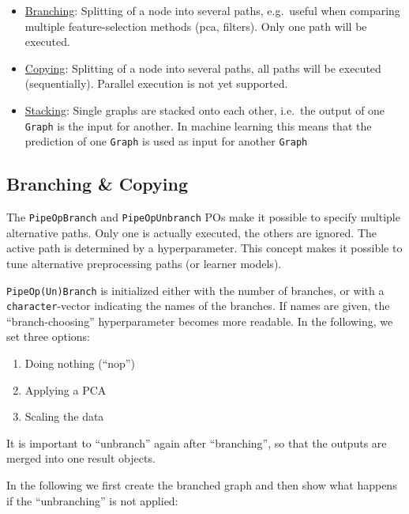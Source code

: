 \documentclass[
  11pt,
  parskip=half,
  DIV=calc,
  BCOR=10mm,
  x11names]{scrbook}
\providecommand{\tightlist}{%
  \setlength{\itemsep}{0pt}\setlength{\parskip}{0pt}}
\begin{document}
\begin{itemize}
\tightlist
\item
  \protect\hyperlink{pipe-model-ensembles-branching}{Branching}:
  Splitting of a node into several paths, e.g.~useful when comparing multiple feature-selection methods (pca, filters).
  Only one path will be executed.
\item
  \protect\hyperlink{pipe-model-ensembles-copying}{Copying}:
  Splitting of a node into several paths, all paths will be executed (sequentially).
  Parallel execution is not yet supported.
\item
  \protect\hyperlink{pipe-model-ensembles-stacking}{Stacking}:
  Single graphs are stacked onto each other, i.e.~the output of one \texttt{Graph} is the input for another.
  In machine learning this means that the prediction of one \texttt{Graph} is used as input for another \texttt{Graph}
\end{itemize}

\hypertarget{pipe-model-ensembles-branching-copying}{%
\subsection{Branching \& Copying}\label{pipe-model-ensembles-branching-copying}}

The \texttt{PipeOpBranch} and \texttt{PipeOpUnbranch} POs make it possible to specify multiple alternative paths.
Only one is actually executed, the others are ignored.
The active path is determined by a hyperparameter.
This concept makes it possible to tune alternative preprocessing paths (or learner models).

\texttt{PipeOp(Un)Branch} is initialized either with the number of branches, or with a \texttt{character}-vector indicating the names of the branches.
If names are given, the ``branch-choosing'' hyperparameter becomes more readable.
In the following, we set three options:

\begin{enumerate}
\def\labelenumi{\arabic{enumi}.}
\tightlist
\item
  Doing nothing (``nop'')
\item
  Applying a PCA
\item
  Scaling the data
\end{enumerate}

It is important to ``unbranch'' again after ``branching'', so that the outputs are merged into one result objects.

In the following we first create the branched graph and then show what happens if the ``unbranching'' is not applied:
\end{document}
